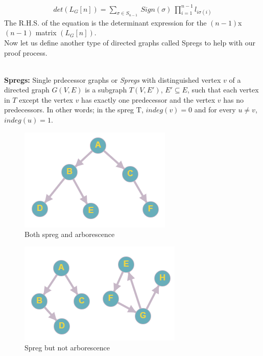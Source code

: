 \begin{align}
    det(L_G[n]) = \sum_{\sigma \in S_{n-1}}~
    Sign(\sigma)~\prod_{i=1}^{n-1}l_{i\sigma(i)}
    \label{eq:to_prove:Tutte}
\end{align} 
The R.H.S. of the equation is the determinant expression for the $(n-1)$x$(n-1)$ matrix $(L_G[n])$.\\Now let us define another type of directed graphs called Spregs to help with our proof process.\\
\noindent\\
\begin{definition}\textbf{Spregs:} Single prdecessor graphs or \textit{Spregs} with distinguished vertex $v$ of a directed graph $G(V,E)$ is a subgraph $T(V,E')$, $E' \subseteq E$, such that each vertex in $T$ except the vertex $v$ has exactly one predecessor and the vertex $v$ has no predecessors. In other words; in the spreg T, $indeg(v) = 0$ and for every $u \neq v$, $indeg(u)=1$.\\
\end{definition}
\begin{figure}[h]
    \centering
    \includegraphics[scale = 0.5]{images/Spreg1.png}
    \caption{Both spreg and arborescence}
    \label{Fig:Spreg1}
\end{figure}
\begin{figure}[h]
    \centering
    \includegraphics[scale = 0.6]{images/Spreg2.png}
    \caption{Spreg but not arborescence}
    \label{Fig:Spreg2}
\end{figure}
\noindent\\
